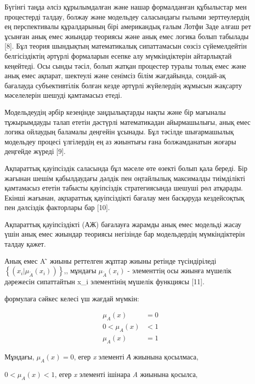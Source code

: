 \begin{multicols}{2}
Бүгінгі таңда әлсіз құрылымдалған және нашар формалданған құбылыстар мен
процестерді талдау, болжау және модельдеу саласындағы ғылыми
зерттеулердің ең перспективалы құралдарының бірі американдық ғалым Лотфи
Заде алғаш рет ұсынған анық емес жиындар теориясы және анық емес логика
болып табылады {[}8{]}. Бұл теория шындықтың математикалық сипаттамасын
сөзсіз сүйемелдейтін белгісіздіктің әртүрлі формаларын есепке алу
мүмкіндіктерін айтарлықтай кеңейтеді. Осы сынды тәсіл, болып жатқан
процестер туралы толық емес және анық емес ақпарат, шектеулі және
сенімсіз білім жағдайында, сондай-ақ бағалауда субъективтілік болған
кезде әртүрлі жүйелердің жұмысын жақсарту мәселелерін шешуді қамтамасыз
етеді.

Модельдеудің әрбір кезеңінде заңдылықтарды нақты және бір мағыналы
тұжырымдауды талап ететін дәстүрлі математикадан айырмашылығы, анық емес
логика ойлаудың баламалы деңгейін ұсынады. Бұл тәсілде шығармашылық
модельдеу процесі үлгілердің ең аз жиынтығы ғана болжамданатын жоғары
деңгейде жүреді {[}9{]}.

Ақпараттық қауіпсіздік саласында бұл мәселе өте өзекті болып қала
береді. Бір жағынан шешім қабылдаудағы дәлдік пен оңтайлылық максималды
тиімділікті қамтамасыз ететін табысты қауіпсіздік стратегиясында шешуші
рөл атқарады. Екінші жағынан, ақпараттық қауіпсіздікті бағалау мен
басқаруда кездейсоқтық пен дәлсіздік факторлары бар {[}10{]}.

Ақпараттық қауіпсіздікті (АЖ) бағалауға жарамды анық емес модельді жасау
үшін анық емес жиындар теориясы негізінде бар модельдердің
мүмкіндіктерін талдау қажет.

Анық емес A ̃ жиыны реттелген жұптар жиыны ретінде түсіндіріледі
\(\left\{ \left( x_{i}|\mu_{\widetilde{A}}(x_{i}) \right) \right\}\),,
мұндағы \(\mu_{\widetilde{A}}(x_{i})\) - элементтің осы жиынға мүшелік
дәрежесін сипаттайтын x\_i элементінің мүшелік функциясы {[}11{]}.

формулаға сәйкес келесі үш жағдай мүмкін:

\begin{equation}
\begin{aligned}
    \mu_{A}(x) &= 0  \\
    0 < \mu_{A}(x) &< 1 \\
    \mu_{A}(x) &= 1
\end{aligned}
\end{equation}

Мұндағы, \(\mu_{A}(x) = 0\), егер \emph{x} элементі \emph{А} жиынына
қосылмаса,

\(0 < \mu_{A}(x) < 1\), егер \emph{x} элементі ішінара \emph{A} жиынына
қосылса,


\end{multicols}
